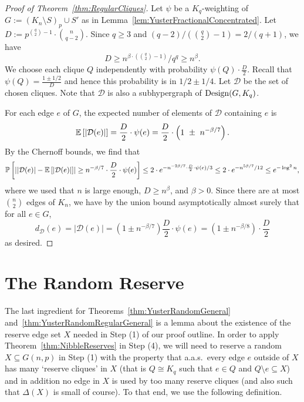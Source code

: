 \documentclass[11pt]{article}
\numberwithin{equation}{section}
\newcommand{\mc}[1]{\mathcal{#1}}
\newcounter{i}
\theoremstyle{plain}
\theoremstyle{plain} %
\theoremstyle{definition}
\newcommand{\cD}{\mathcal{D}}
\newcommand{\Prob}[1]{\ensuremath{%
\mathbb P\left[#1\right]
}}
\newcommand{\Expect}[1]{\ensuremath{%
\mathbb E\left[#1\right]
}}
\newcommand{\aas}{a.a.s.\ }
\begin{document}
\begin{proof}[Proof of Theorem~\ref{thm:RegularCliques}]
Let $\psi$ be a $K_q$-weighting of $G:=(K_n\setminus S)_p\cup S'$ as in Lemma~\ref{lem:YusterFractionalConcentrated}. Let $D:= p^{\binom{q}{2}-1}\cdot \binom{n}{q-2}$. Since $q\geq 3$ and $(q - 2)/(\binom{q}{2}-1) = 2/(q + 1)$, we have 
$$D\ge n^{\beta\cdot \left(\binom{q}{2}-1\right)}/q^q \ge n^{\beta}.$$
We choose each clique $Q$ independently with probability $\psi(Q)\cdot \frac{D}{2}$. Recall that $\psi(Q) =\frac{1\pm 1/2}{D}$ and hence this probability is in $1/2 \pm 1/4$. Let $\mc{D}$ be the set of chosen cliques. Note that $\mc{D}$ is also a subhypergraph of ${\rm Design}(G,K_q)$.

For each edge $e$ of $G$, the expected number of elements of $\mc{D}$ containing $e$ is
$$\Expect{|\mc{D}(e)|} = \frac{D}{2}\cdot \psi(e) = \frac{D}{2}\cdot \left(1~\pm~n^{-\beta/7}\right).$$
By the Chernoff bounds, we find that 
\begin{equation*}
    \Prob{ \left| |\mc{D}(e)| - \Expect{|\mc{D}(e)|}\right| \ge n^{-\beta/7}\cdot \frac{D}{2} \cdot \psi(e)} \le 2\cdot e^{-n^{-2\beta/7}\cdot \frac{D}{2} \cdot \psi(e)/ 3} \le 2\cdot e^{-n^{5\beta/7}/12} \le e^{-\log^2 n},
\end{equation*}
where we used that $n$ is large enough, $D \geq n^\beta$, and $\beta > 0$.
Since there are at most $\binom{n}{2}$ edges of $K_n$, we have by the union bound asymptotically almost surely that for all $e\in G$,
\begin{equation*}
    d_{\cD}(e) = |\mc{D}(e)| = \left(1\pm n^{-\beta/7}\right)\frac{D}{2}\cdot \psi(e) = \left(1\pm n^{-\beta/8}\right)\cdot \frac{D}{2}
\end{equation*}
as desired. 
\end{proof}

\section{The Random Reserve}\label{s:Random-Reserve}

The last ingredient for Theorems~\ref{thm:YusterRandomGeneral} and~\ref{thm:YusterRandomRegularGeneral} is a lemma about the existence of the reserve edge set $X$ needed in Step (1) of our proof outline. 
In order to apply Theorem~\ref{thm:NibbleReserves} in Step (4), we will need to reserve a random $X \subseteq G(n,p)$ in Step (1) with the property that \aas every edge $e$ outside of $X$ has many `reserve cliques' in $X$ (that is $Q \cong K_q$ such that $e\in Q$ and $Q\setminus e \subseteq X$) and in addition no edge in $X$ is used by too many reserve cliques (and also such that $\Delta(X)$ is small of course).
To that end, we use the following definition.
\end{document}
